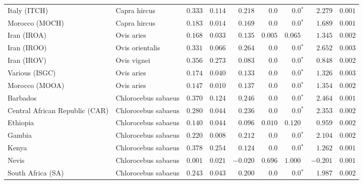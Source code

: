 \begin{center}
\begin{adjustbox}{width = 1\textwidth}
\begin{tabular}{|l|l|r|r|r|r|r|r|r|}
            Italy (ITCH)                    & Capra hircus          & $ 0.333$ & $ 0.114$  & $ 0.218$ & $0.0$ & $\bm{0.0{^*}}$     & $ 2.279$ & $ 0.001$  \\
            Morocco (MOCH)                    & Capra hircus     & $ 0.183$ & $ 0.014$  & $ 0.169$ & $0.0$    & $\bm{0.0{^*}}$ & $ 1.689$ & $ 0.001$ \\
            Iran (IROA)                    & Ovis aries         & $ 0.168$ & $ 0.033$  & $ 0.135$ & $ 0.005$    & $ 0.065~~$ & $ 1.345$ & $ 0.002$ \\
            Iran (IROO)                 & Ovis orientalis          & $ 0.331$ & $ 0.066$  & $ 0.264$ & $0.0$    & $\bm{0.0{^*}}$ & $ 2.652$ & $ 0.003$ \\
            Iran (IROV)                 & Ovis vignei          & $ 0.356$ & $ 0.273$  & $ 0.083$ & $0.0$    & $\bm{0.0{^*}}$ & $ 0.848$ & $ 0.002$ \\
            Various (ISGC)                       & Ovis aries & $ 0.174$ & $ 0.040$  & $ 0.133$ & $0.0$    & $\bm{0.0{^*}}$ & $ 1.326$ & $ 0.003$ \\
            Morocco (MOOA) & Ovis aries & $ 0.147$ & $ 0.010$  & $ 0.137$ & $0.0$ & $\bm{0.0{^*}}$ & $ 1.354$ & $ 0.002$ \\
            Barbados                       & Chlorocebus sabaeus & $ 0.370$ & $ 0.124$  & $ 0.246$ & $0.0$ & $\bm{0.0{^*}}$     & $ 2.464$ & $ 0.001$ \\
            Central African Republic (CAR)                         & Chlorocebus sabaeus & $ 0.280$ & $ 0.044$  & $ 0.236$ & $0.0$    & $\bm{0.0{^*}}$ & $ 2.353$ & $ 0.002$ \\
            Ethiopia                          & Chlorocebus sabaeus & $ 0.140$ & $ 0.044$  & $ 0.096$ & $ 0.010$    & $ 0.120~~$ & $ 0.959$ & $ 0.002$ \\
            Gambia                          & Chlorocebus sabaeus & $ 0.220$ & $ 0.008$  & $ 0.212$ & $0.0$ & $\bm{0.0{^*}}$     & $ 2.104$ & $ 0.002$ \\
            Kenya              & Chlorocebus sabaeus & $ 0.378$ & $ 0.254$  & $ 0.124$ & $0.0$    & $\bm{0.0{^*}}$ & $ 1.262$ & $ 0.001$ \\
            Nevis               & Chlorocebus sabaeus & $ 0.001$ & $ 0.021$  & $-0.020$ & $ 0.696$ & $ 1.000~~$ & $-0.201$ & $ 0.001$ \\
            South Africa (SA)                         & Chlorocebus sabaeus & $ 0.243$ & $ 0.043$  & $ 0.200$ & $0.0$ & $\bm{0.0{^*}}$     & $ 1.987$ & $ 0.002$ \\

\end{tabular}
\end{adjustbox}
\end{center}

